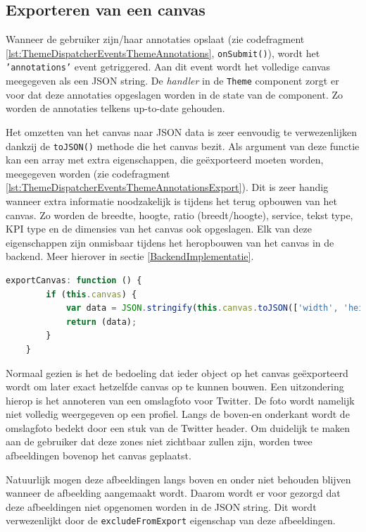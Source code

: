 \subsection{Exporteren van een canvas}
Wanneer de gebruiker zijn/haar annotaties opslaat (zie codefragment \ref{lst:ThemeDispatcherEventsThemeAnnotations}, \texttt{onSubmit()}), wordt het \texttt{'annotations'} event getriggered. Aan dit event wordt het volledige canvas meegegeven als een JSON string. De \textit{handler} in de \texttt{Theme} component zorgt er voor dat deze annotaties opgeslagen worden in de state van de component. Zo worden de annotaties telkens up-to-date gehouden. 

Het omzetten van het canvas naar JSON data is zeer eenvoudig te verwezenlijken dankzij de \texttt{toJSON()} methode die het canvas bezit. Als argument van deze functie kan een array met extra eigenschappen, die ge\"{e}xporteerd moeten worden, meegegeven worden (zie codefragment \ref{lst:ThemeDispatcherEventsThemeAnnotationsExport}). Dit is zeer handig wanneer extra informatie noodzakelijk is tijdens het terug opbouwen van het canvas. Zo worden de breedte, hoogte, ratio (breedt/hoogte), service, tekst type, KPI type en de dimensies van het canvas ook opgeslagen. Elk van deze eigenschappen zijn onmisbaar tijdens het heropbouwen van het canvas in de backend. Meer hierover in sectie \ref{BackendImplementatie}. 

\begin{lstlisting}[caption={ThemeAnnotations component - Exporteren van het canvas},label=lst:ThemeDispatcherEventsThemeAnnotationsExport,language=javascript]
	exportCanvas: function () {
		if (this.canvas) {
			var data = JSON.stringify(this.canvas.toJSON(['width', 'height', 'multiply', 'service', 'textType', 'kpiType', 'dimensions']));
			return (data);
		}
	}
\end{lstlisting}

Normaal gezien is het de bedoeling dat ieder object op het canvas ge\"{e}xporteerd wordt om later exact hetzelfde canvas op te kunnen bouwen. Een uitzondering hierop is het annoteren van een omslagfoto voor Twitter. De foto wordt namelijk niet volledig weergegeven op een profiel. Langs de boven-en onderkant wordt de omslagfoto bedekt door een stuk van de Twitter header. Om duidelijk te maken aan de gebruiker dat deze zones niet zichtbaar zullen zijn, worden twee afbeeldingen bovenop het canvas geplaatst. 


Natuurlijk mogen deze afbeeldingen langs boven en onder niet behouden blijven wanneer de afbeelding aangemaakt wordt. Daarom wordt er voor gezorgd dat deze afbeeldingen niet opgenomen worden in de JSON string. Dit wordt verwezenlijkt door de \texttt{excludeFromExport} eigenschap van deze afbeeldingen.

